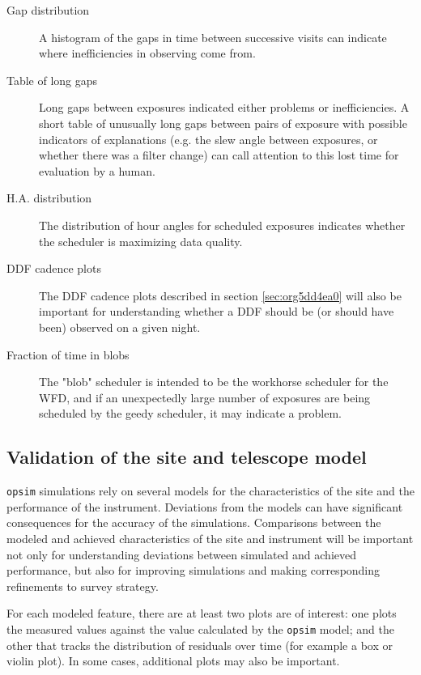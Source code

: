 \begin{description}
\item[{Gap distribution}] A histogram of the gaps in time between successive visits can indicate where inefficiencies in observing come from.
\item[{Table of long gaps}] Long gaps between exposures indicated either problems or inefficiencies. A short table of unusually long gaps between pairs of exposure with possible indicators of explanations (e.g. the slew angle between exposures, or whether there was a filter change) can call attention to this lost time for evaluation by a human.
\item[{H.A. distribution}] The distribution of hour angles for scheduled exposures indicates whether the scheduler is maximizing data quality.
\item[{DDF cadence plots}] The DDF cadence plots described in section \ref{sec:org5dd4ea0} will also be important for understanding whether a DDF should be (or should have been) observed on a given night.
\item[{Fraction of time in blobs}] The "blob" scheduler is intended to be the workhorse scheduler for the WFD, and if an unexpectedly large number of exposures are being scheduled by the geedy scheduler, it may indicate a problem.
\end{description}

\subsection{Validation of the site and telescope model}
\label{sec:orgd296f78}
\texttt{opsim} simulations rely on several models for the characteristics of the site and the performance of the instrument.
Deviations from the models can have significant consequences for the accuracy of the simulations.
Comparisons between the modeled and achieved characteristics of the site and instrument will be important not only for understanding deviations between simulated and achieved performance, but also for improving simulations and making corresponding refinements to survey strategy.

For each modeled feature, there are at least two plots are of interest: one plots the measured values against the value calculated by the \texttt{opsim} model; and the other that tracks the distribution of residuals over time (for example a box or violin plot).
In some cases, additional plots may also be important.

